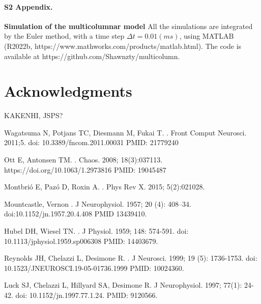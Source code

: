 \documentclass[10pt,letterpaper]{article}
\begin{document}
\paragraph*{S2 Appendix.}
\label{S2_Appendix}
{\bf Simulation of the multicolumnar model} All the simulations are integrated by the Euler method, with a time step $\Delta t=0.01 (ms)$, using MATLAB (R2022b, https://www.mathworks.com/products/matlab.html). The code is available at https://github.com/Shawnzty/multicolumn.

\section*{Acknowledgments}
KAKENHI, JSPS?

\nolinenumbers

%
%
% 
\begin{thebibliography}{10}

Wagatsuma N, Potjans TC, Diesmann M, Fukai T.
.
\newblock Front Comput Neurosci. 2011;5. doi: 10.3389/fncom.2011.00031 PMID: 21779240

Ott E, Antonsen TM.
.
\newblock Chaos. 2008; 18(3):037113. https://doi.org/10.1063/1.2973816 PMID: 19045487

Montbrió E, Pazó D, Roxin A.
.
\newblock Phys Rev X. 2015; 5(2):021028.

Mountcastle, Vernon
.
\newblock J Neurophysiol. 1957; 20 (4): 408–34. doi:10.1152/jn.1957.20.4.408 PMID 13439410.

Hubel DH, Wiesel TN.
.
\newblock J Physiol. 1959; 148: 574-591. doi: 10.1113/jphysiol.1959.sp006308 PMID: 14403679.

Reynolds JH, Chelazzi L, Desimone R.
.
\newblock J Neurosci. 1999; 19 (5): 1736-1753. doi: 10.1523/JNEUROSCI.19-05-01736.1999 PMID: 10024360.

Luck SJ, Chelazzi L, Hillyard SA, Desimone R.
\newblock J Neurophysiol. 1997; 77(1): 24-42. doi: 10.1152/jn.1997.77.1.24. PMID: 9120566.


\end{thebibliography}
\end{document}

